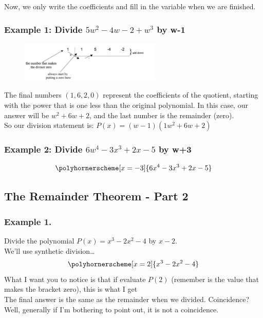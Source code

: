 \documentclass{article}
\begin{document}
Now, we only write the coefficients and fill in the variable when we are finished.
\subsubsection*{Example 1: Divide $5w^2-4w-2+w^3$ by w-1}
\begin{figure}[h]
    \centering
    \includegraphics[width=0.6\textwidth]{imgs/synthetic division.png}
\end{figure}


The final numbers $(1,6,2,0)$ represent the coefficients of the quotient, starting with the power that is one less than the original polynomial. In this case, our answer will be $w^2 + 6w + 2$, and the last number is the remainder (zero).\\

So our division statement is: $P(x)=(w-1)(1w^2+6w+2)$
\subsubsection*{Example 2: Divide $6w^4-3x^3+2x-5$ by w+3 }
$$\polyhornerscheme[x=-3]{6x^4-3x^3+2x-5}$$
\newpage 
\subsection{The Remainder Theorem - Part 2}
\subsubsection*{Example 1.} Divide the polynomial $P(x)=x^3-2x^2-4$ by $x-2$.\\
We’ll use synthetic division…
$$\polyhornerscheme[x=2]{x^3-2x^2-4}$$
What I want you to notice is that if evaluate $P(2)$ (remember is the value that makes the bracket zero), this is what I get \\
The final answer is the same as the remainder when we divided. Coincidence? Well, generally if I'm bothering to point out, it is not a coincidence.
\end{document}
